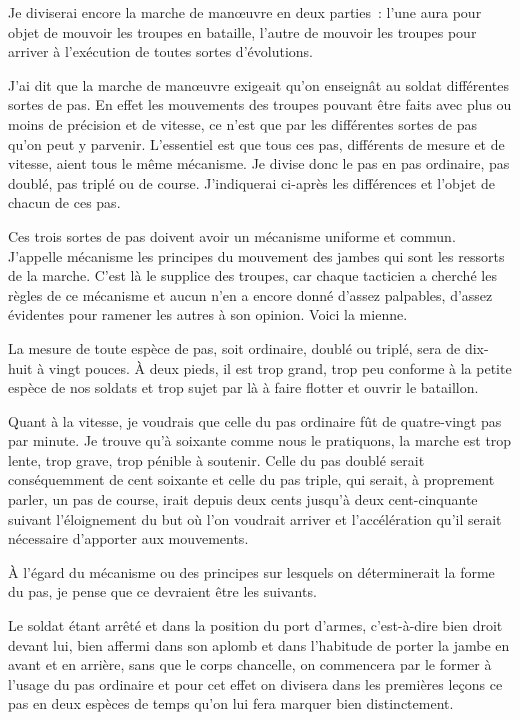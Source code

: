 \documentclass[french,twoside]{book} %
\begin{document}
Je diviserai encore la marche de manœuvre en deux parties : l’une aura pour objet de mouvoir les troupes en bataille, l’autre de mouvoir les troupes pour arriver à l’exécution de toutes sortes d’évolutions.\par
J’ai dit que la marche de manœuvre exigeait qu’on enseignât au soldat différentes sortes de pas. En effet les mouvements des troupes pouvant être faits avec plus ou moins de précision et de vitesse, ce n’est que par les différentes sortes de pas qu’on peut y parvenir. L’essentiel est que tous ces pas, différents de mesure et de vitesse, aient tous le même mécanisme. Je divise donc le pas en pas ordinaire, pas doublé, pas triplé ou de course. J’indiquerai ci-après les différences et l’objet de chacun de ces pas.\par
Ces trois sortes de pas doivent avoir un mécanisme uniforme et commun. J’appelle mécanisme les principes du mouvement des jambes qui sont les ressorts de la marche. C’est là le supplice des troupes, car chaque tacticien a cherché les règles de ce mécanisme et aucun n’en a encore donné d’assez palpables, d’assez évidentes pour ramener les autres à son opinion. Voici la mienne.\par
La mesure de toute espèce de pas, soit ordinaire, doublé ou triplé, sera de dix-huit à vingt pouces. À deux pieds, il est trop grand, trop peu conforme à la petite espèce de nos soldats et trop sujet par là à faire flotter et ouvrir le bataillon.\par
Quant à la vitesse, je voudrais que celle du pas ordinaire fût de quatre-vingt pas par minute. Je trouve qu’à soixante comme nous le pratiquons, la marche est trop lente, trop grave, trop pénible à soutenir. Celle du pas doublé serait conséquemment de cent soixante et celle du pas triple, qui serait, à proprement parler, un pas de course, irait depuis deux cents jusqu’à deux cent-cinquante suivant l’éloignement du but où l’on voudrait arriver et l’accélération qu’il serait nécessaire d’apporter aux mouvements.\par
À l’égard du mécanisme ou des principes sur lesquels on déterminerait la forme du pas, je pense que ce devraient être les suivants.\par
Le soldat étant arrêté et dans la position du port d’armes, c’est-à-dire bien droit devant lui, bien affermi dans son aplomb et dans l’habitude de porter la jambe en avant et en arrière, sans que le corps chancelle, on commencera par le former à l’usage du pas ordinaire et pour cet effet on divisera dans les premières leçons ce pas en deux espèces de temps qu’on lui fera marquer bien distinctement.\par
\end{document}
